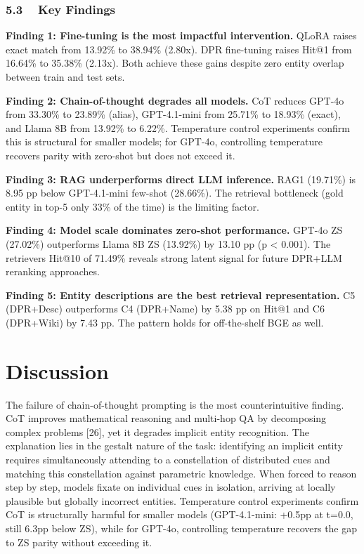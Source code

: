 ﻿\documentclass{article}
\begin{document}
\subsubsection{5.3 ~ Key Findings}\label{key-findings}

\textbf{Finding 1: Fine-tuning is the most impactful intervention.}
QLoRA raises exact match from 13.92\% to 38.94\% (2.80x). DPR
fine-tuning raises Hit@1 from 16.64\% to 35.38\% (2.13x). Both achieve
these gains despite zero entity overlap between train and test sets.

\textbf{Finding 2: Chain-of-thought degrades all models.} CoT reduces
GPT-4o from 33.30\% to 23.89\% (alias), GPT-4.1-mini from 25.71\% to
18.93\% (exact), and Llama 8B from 13.92\% to 6.22\%. Temperature
control experiments confirm this is structural for smaller models; for
GPT-4o, controlling temperature recovers parity with zero-shot but does
not exceed it.

\textbf{Finding 3: RAG underperforms direct LLM inference.} RAG1
(19.71\%) is 8.95 pp below GPT-4.1-mini few-shot (28.66\%). The
retrieval bottleneck (gold entity in top-5 only 33\% of the time) is the
limiting factor.

\textbf{Finding 4: Model scale dominates zero-shot performance.} GPT-4o
ZS (27.02\%) outperforms Llama 8B ZS (13.92\%) by 13.10 pp (p
\textless{} 0.001). The retriever\textquotesingle s Hit@10 of 71.49\%
reveals strong latent signal for future DPR+LLM reranking approaches.

\textbf{Finding 5: Entity descriptions are the best retrieval
representation.} C5 (DPR+Desc) outperforms C4 (DPR+Name) by 5.38 pp on
Hit@1 and C6 (DPR+Wiki) by 7.43 pp. The pattern holds for off-the-shelf
BGE as well.

\section{Discussion}\label{discussion}

The failure of chain-of-thought prompting is the most counterintuitive
finding. CoT improves mathematical reasoning and multi-hop QA by
decomposing complex problems {[}26{]}, yet it degrades implicit entity
recognition. The explanation lies in the gestalt nature of the task:
identifying an implicit entity requires simultaneously attending to a
constellation of distributed cues and matching this constellation
against parametric knowledge. When forced to reason step by step, models
fixate on individual cues in isolation, arriving at locally plausible
but globally incorrect entities. Temperature control experiments confirm
CoT is structurally harmful for smaller models (GPT-4.1-mini: +0.5pp at
t=0.0, still 6.3pp below ZS), while for GPT-4o, controlling temperature
recovers the gap to ZS parity without exceeding it.
\end{document}
